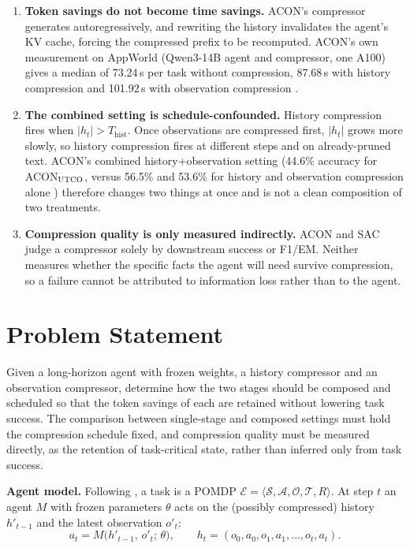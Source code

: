 \documentclass[10pt,a4paper]{article}
\begin{document}
\begin{enumerate}[label=(\alph*)]
\item \textbf{Token savings do not become time savings.} ACON's compressor
generates autoregressively, and rewriting the history invalidates the agent's
KV cache, forcing the compressed prefix to be recomputed. ACON's own
measurement on AppWorld (Qwen3-14B agent and compressor, one A100) gives a
median of 73.24\,s per task without compression, 87.68\,s with history
compression and 101.92\,s with observation compression \cite{ACON}.

\item \textbf{The combined setting is schedule-confounded.} History compression
fires when $|h_t|>T_{\mathrm{hist}}$. Once observations are compressed first,
$|h_t|$ grows more slowly, so history compression fires at different steps and
on already-pruned text. ACON's combined history+observation setting
(44.6\% accuracy for ACON$_{\textsc{UTCO}}$, versus 56.5\% and 53.6\% for
history and observation compression alone \cite{ACON}) therefore changes two
things at once and is not a clean composition of two treatments.

\item \textbf{Compression quality is only measured indirectly.} ACON and SAC
judge a compressor solely by downstream success or F1/EM. Neither measures
whether the specific facts the agent will need survive compression, so a
failure cannot be attributed to information loss rather than to the agent.
\end{enumerate}

\section{Problem Statement}\label{sec:ps}

Given a long-horizon agent with frozen weights, a history compressor and an
observation compressor, determine how the two stages should be composed and
scheduled so that the token savings of each are retained without lowering task
success. The comparison between single-stage and composed settings must hold
the compression schedule fixed, and compression quality must be measured
directly, as the retention of task-critical state, rather than inferred only
from task success.

\textbf{Agent model.} Following \cite{ACON}, a task is a POMDP
$\mathcal{E}=\langle\mathcal{S},\mathcal{A},\mathcal{O},\mathcal{T},R\rangle$.
At step $t$ an agent $M$ with frozen parameters $\theta$ acts on the (possibly
compressed) history $h'_{t-1}$ and the latest observation $o'_t$:
\begin{equation}
a_t = M\big(h'_{t-1},\,o'_t;\,\theta\big),\qquad
h_t=(o_0,a_0,o_1,a_1,\dots,o_t,a_t).
\label{eq:agent}
\end{equation}
\end{document}
